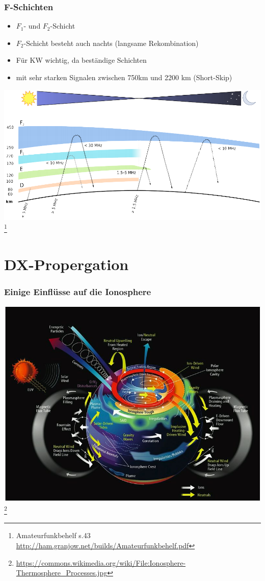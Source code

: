 \begin{frame}
    \frametitle{F-Schichten}
    \begin{itemize}
        \item $F_1$- und $F_2$-Schicht
        \item $F_2$-Schicht besteht auch nachts (langsame Rekombination)
        \item Für KW wichtig, da beständige Schichten
        \item mit sehr starken Signalen zwischen 750km und 2200 km (Short-Skip)
    \end{itemize}
	\begin{center}
        \includegraphics[width=.8\textwidth,height=.4\textheight,keepaspectratio]{e09/schichten_behelf_43.png}
        \footnote{\tiny Amateurfunkbehelf s.43 \url{http://ham.granjow.net/builds/Amateurfunkbehelf.pdf}}
    \end{center}
\end{frame}

\section*{DX-Propergation}

\begin{frame}
  \frametitle{Einige Einflüsse auf die Ionosphere}
  \begin{center}
    \includegraphics[width=.8\textwidth,height=.8\textheight,keepaspectratio]{e09/Ionosphere-Thermosphere_Processes.jpg}
    \footnote{\tiny \url{https://commons.wikimedia.org/wiki/File:Ionosphere-Thermosphere_Processes.jpg}}\\
  \end{center}
\end{frame}

